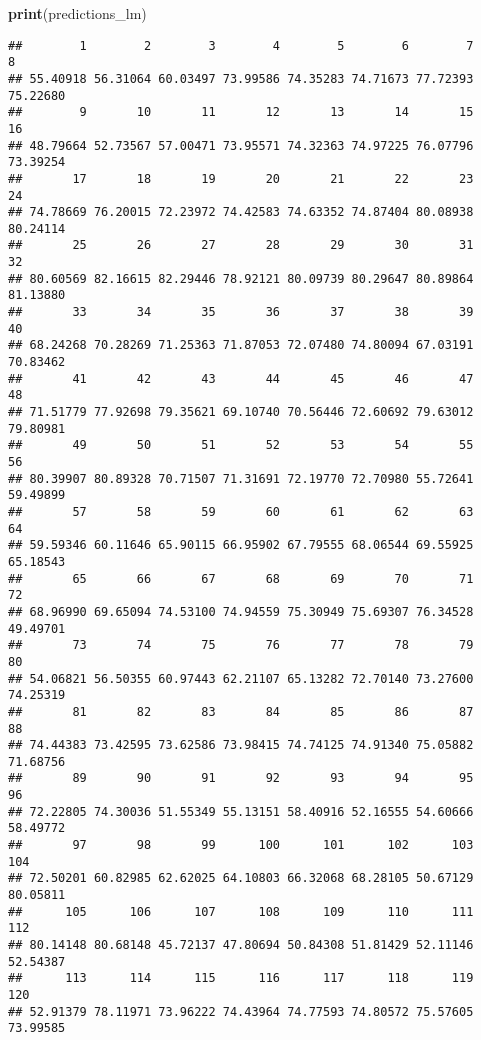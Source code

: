 \documentclass[
]{article}
\newenvironment{Shaded}{\begin{snugshade}}{\end{snugshade}}
\newcommand{\FunctionTok}[1]{\textcolor[rgb]{0.13,0.29,0.53}{\textbf{#1}}}
\newcommand{\NormalTok}[1]{#1}
\begin{document}
\begin{Shaded}
\begin{Highlighting}[]
\FunctionTok{print}\NormalTok{(predictions\_lm)}
\end{Highlighting}
\end{Shaded}

\begin{verbatim}
##        1        2        3        4        5        6        7        8 
## 55.40918 56.31064 60.03497 73.99586 74.35283 74.71673 77.72393 75.22680 
##        9       10       11       12       13       14       15       16 
## 48.79664 52.73567 57.00471 73.95571 74.32363 74.97225 76.07796 73.39254 
##       17       18       19       20       21       22       23       24 
## 74.78669 76.20015 72.23972 74.42583 74.63352 74.87404 80.08938 80.24114 
##       25       26       27       28       29       30       31       32 
## 80.60569 82.16615 82.29446 78.92121 80.09739 80.29647 80.89864 81.13880 
##       33       34       35       36       37       38       39       40 
## 68.24268 70.28269 71.25363 71.87053 72.07480 74.80094 67.03191 70.83462 
##       41       42       43       44       45       46       47       48 
## 71.51779 77.92698 79.35621 69.10740 70.56446 72.60692 79.63012 79.80981 
##       49       50       51       52       53       54       55       56 
## 80.39907 80.89328 70.71507 71.31691 72.19770 72.70980 55.72641 59.49899 
##       57       58       59       60       61       62       63       64 
## 59.59346 60.11646 65.90115 66.95902 67.79555 68.06544 69.55925 65.18543 
##       65       66       67       68       69       70       71       72 
## 68.96990 69.65094 74.53100 74.94559 75.30949 75.69307 76.34528 49.49701 
##       73       74       75       76       77       78       79       80 
## 54.06821 56.50355 60.97443 62.21107 65.13282 72.70140 73.27600 74.25319 
##       81       82       83       84       85       86       87       88 
## 74.44383 73.42595 73.62586 73.98415 74.74125 74.91340 75.05882 71.68756 
##       89       90       91       92       93       94       95       96 
## 72.22805 74.30036 51.55349 55.13151 58.40916 52.16555 54.60666 58.49772 
##       97       98       99      100      101      102      103      104 
## 72.50201 60.82985 62.62025 64.10803 66.32068 68.28105 50.67129 80.05811 
##      105      106      107      108      109      110      111      112 
## 80.14148 80.68148 45.72137 47.80694 50.84308 51.81429 52.11146 52.54387 
##      113      114      115      116      117      118      119      120 
## 52.91379 78.11971 73.96222 74.43964 74.77593 74.80572 75.57605 73.99585 

\end{verbatim}
\end{document}
